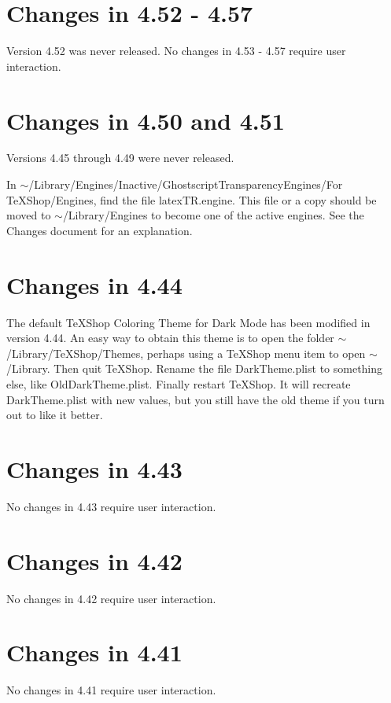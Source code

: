 \documentclass[11pt, oneside]{amsart}
\begin{document}
\section{Changes in 4.52 - 4.57}

Version 4.52 was never released. No changes in 4.53 - 4.57 require user interaction.  


\section{Changes in 4.50 and 4.51}

Versions 4.45 through 4.49 were never released. 

In  $\sim$/Library/Engines/Inactive/GhostscriptTransparencyEngines/For TeXShop/Engines, find the file  latexTR.engine. This file or a copy should be moved to $\sim$/Library/Engines to become one of the active engines. See the Changes document for an explanation.

\section{Changes in 4.44}

The default TeXShop Coloring Theme for Dark Mode has been modified in version 4.44. An easy way to obtain this theme is to open the folder $\sim$/Library/TeXShop/Themes, perhaps using a TeXShop menu item to open $\sim$/Library.  Then quit TeXShop. Rename the file DarkTheme.plist to something else, like OldDarkTheme.plist. Finally restart TeXShop. It will recreate DarkTheme.plist with new values, but you still have the old theme if you turn out to like it better.

\section{Changes in 4.43}

No changes in 4.43 require user interaction.

\section{Changes in 4.42}

No changes in 4.42 require user interaction.

\section{Changes in 4.41}

No changes in 4.41 require user interaction.
\end{document}
